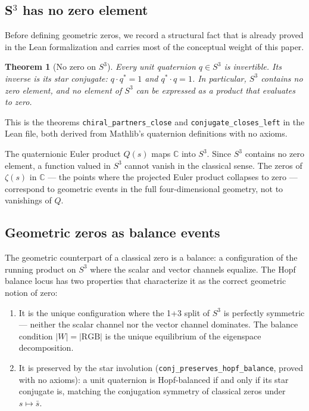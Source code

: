 \documentclass[12pt,a4paper]{article}
\newtheorem{theorem}{Theorem}[section]
\theoremstyle{definition}
\theoremstyle{remark}
\begin{document}
\subsection{S\texorpdfstring{$^3$}{3} has no zero element}

Before defining geometric zeros, we record a structural fact that is already
proved in the Lean formalization and carries most of the conceptual weight of
this paper.

\begin{theorem}[No zero on $S^3$]\label{thm:no_zero}
Every unit quaternion $q \in S^3$ is invertible. Its inverse is its star
conjugate: $q \cdot q^* = 1$ and $q^* \cdot q = 1$. In particular, $S^3$
contains no zero element, and no element of $S^3$ can be expressed as a
product that evaluates to zero.
\end{theorem}

This is the theorems \texttt{chiral\_partners\_close} and
\texttt{conjugate\_closes\_left} in the Lean file, both derived from Mathlib's
quaternion definitions with no axioms.

The quaternionic Euler product $Q(s)$ maps $\mathbb{C}$ into $S^3$. Since
$S^3$ contains no zero element, a function valued in $S^3$ cannot vanish in
the classical sense. The zeros of $\zeta(s)$ in $\mathbb{C}$ --- the points
where the projected Euler product collapses to zero --- correspond to geometric
events in the full four-dimensional geometry, not to vanishings of $Q$.

\subsection{Geometric zeros as balance events}

The geometric counterpart of a classical zero is a balance: a configuration
of the running product on $S^3$ where the scalar and vector channels
equalize. The Hopf balance locus has two properties that
characterize it as the correct geometric notion of zero:

\begin{enumerate}
  \item It is the unique configuration where the 1+3 split of $S^3$ is
        perfectly symmetric --- neither the scalar channel nor the vector
        channel dominates. The balance condition $|W| = |\mathrm{RGB}|$ is
        the unique equilibrium of the eigenspace decomposition.

  \item It is preserved by the star involution
        (\texttt{conj\_preserves\_hopf\_balance}, proved with no axioms): a
        unit quaternion is Hopf-balanced if and only if its star conjugate is,
        matching the conjugation symmetry of classical zeros under $s \mapsto
        \bar{s}$.
\end{enumerate}
\end{document}
